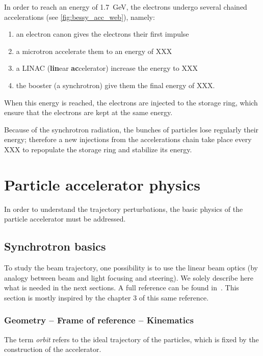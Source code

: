 In order to reach an energy of 1.7~GeV, the electrons undergo several chained accelerations (see \autoref{fig:bessy_acc_web}), namely:
\begin{enumerate}
    \item an electron canon gives the electrons their first impulse
    \item a microtron accelerate them to an energy of XXX
    \item a LINAC (\textbf{lin}ear \textbf{ac}celerator) increase the energy to XXX
    \item the booster (a synchrotron) give them the final energy of XXX.
\end{enumerate}

When this energy is reached, the electrons are injected to the storage ring, which ensure that the electrons are kept at the same energy.

Because of the synchrotron radiation, the bunches of particles lose regularly their energy; therefore a new injections from the accelerations chain take place every XXX to repopulate the storage ring and stabilize its energy.

\section{Particle accelerator physics}
In order to understand the trajectory perturbations, the basic physics of the particle accelerator must be addressed.

\subsection{Synchrotron basics}
To study the beam trajectory, one possibility is to use the linear beam optics (by analogy between beam and light focusing and steering). We solely describe here what is needed in the next sections. A full reference can be found in~\cite{book:wille}. This section is mostly inspired by the chapter 3 of this same reference.

\subsubsection{Geometry -- Frame of reference -- Kinematics}
The term \emph{orbit} refers to the ideal trajectory of the particles, which is fixed by the construction of the accelerator.

